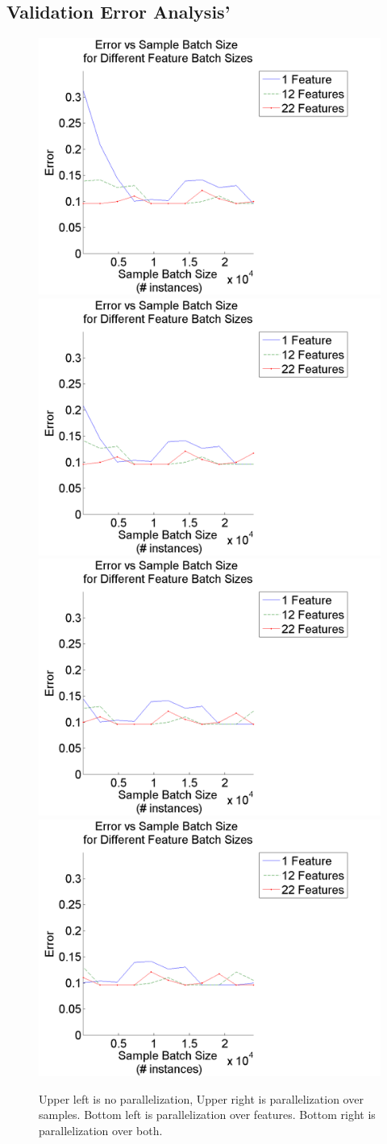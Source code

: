 \documentclass{article}
\begin{document}
\subsection{Validation Error Analysis'}
\begin{figure}
\centering
\includegraphics[width = .4\linewidth]{samperrplot6}
\includegraphics[width = .4\linewidth]{samperrplot8}
\includegraphics[width = .4\linewidth]{samperrplot10}
\includegraphics[width = .4\linewidth]{samperrplot12}
\caption{Upper left is no parallelization, Upper right is parallelization over samples. Bottom left is parallelization over features. Bottom right is parallelization over both.}
\end{figure}
\end{document}
